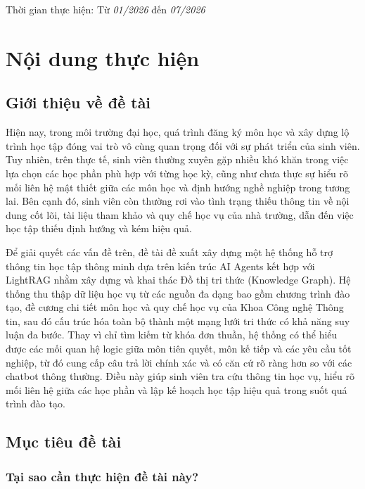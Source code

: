 \begin{refsection}
Thời gian thực hiện: Từ \textit{01/2026} đến \textit{07/2026}

\section*{\thepropsec\quad Nội dung thực hiện}

\subsection*{\thepropsubsec\quad Giới thiệu về đề tài}

Hiện nay, trong môi trường đại học, quá trình đăng ký môn học và xây dựng lộ trình học tập đóng vai trò vô cùng quan trọng đối với sự phát triển của sinh viên. Tuy nhiên, trên thực tế, sinh viên thường xuyên gặp nhiều khó khăn trong việc lựa chọn các học phần phù hợp với từng học kỳ, cũng như chưa thực sự hiểu rõ mối liên hệ mật thiết giữa các môn học và định hướng nghề nghiệp trong tương lai. Bên cạnh đó, sinh viên còn thường rơi vào tình trạng thiếu thông tin về nội dung cốt lõi, tài liệu tham khảo và quy chế học vụ của nhà trường, dẫn đến việc học tập thiếu định hướng và kém hiệu quả.

Để giải quyết các vấn đề trên, đề tài đề xuất xây dựng một hệ thống hỗ trợ thông tin học tập thông minh dựa trên kiến trúc AI Agents kết hợp với LightRAG nhằm xây dựng và khai thác Đồ thị tri thức (Knowledge Graph). Hệ thống thu thập dữ liệu học vụ từ các nguồn đa dạng bao gồm chương trình đào tạo, đề cương chi tiết môn học và quy chế học vụ của Khoa Công nghệ Thông tin, sau đó cấu trúc hóa toàn bộ thành một mạng lưới tri thức có khả năng suy luận đa bước. Thay vì chỉ tìm kiếm từ khóa đơn thuần, hệ thống có thể hiểu được các mối quan hệ logic giữa môn tiên quyết, môn kế tiếp và các yêu cầu tốt nghiệp, từ đó cung cấp câu trả lời chính xác và có căn cứ rõ ràng hơn so với các chatbot thông thường. Điều này giúp sinh viên tra cứu thông tin học vụ, hiểu rõ mối liên hệ giữa các học phần và lập kế hoạch học tập hiệu quả trong suốt quá trình đào tạo.

\subsection*{\thepropsubsec\quad Mục tiêu đề tài}

\subsubsection*{\thepropsubsubsec\quad Tại sao cần thực hiện đề tài này?}


\end{refsection}
